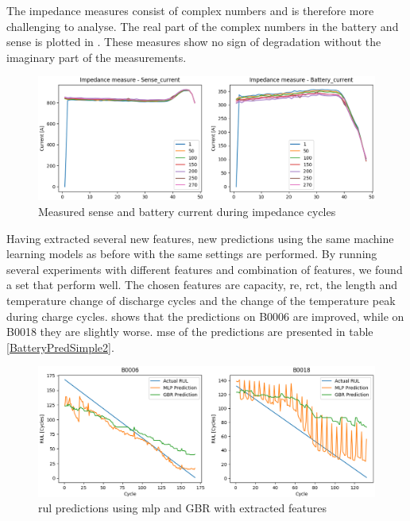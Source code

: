 \documentclass[english, a4paper]{report}
\begin{document}
{{{{                The impedance measures consist of complex numbers and is therefore more challenging to analyse. The real part of the complex numbers in the battery and sense is plotted in . These measures show no sign of degradation without the imaginary part of the measurements.  
                
                \begin{figure}[H]
                    \centering \includegraphics[width=1\textwidth]{ImpedanceDegradadtion}
                    \caption{Measured sense and battery current during impedance cycles}
                    \label{fig:ImpedanceDegradadtion}
                \end{figure}
                
                Having extracted several new features, new predictions using the same machine learning models as before with the same settings are performed. By running several experiments with different features and combination of features, we found a set that perform well. The chosen features are capacity, re, rct, the length and temperature change of discharge cycles and the change of the temperature peak during charge cycles.  shows that the predictions on B0006 are improved, while on B0018 they are slightly worse. \gls{mse} of the predictions are presented in table \ref{BatteryPredSimple2}.
                
                \begin{figure}[H]
                    \centering \includegraphics[width=1\textwidth]{Prediction-AddedFeatures2}
                    \caption{\gls{rul} predictions using \gls{mlp} and GBR with extracted features}
                    \label{fig:Prediction-AddedFeatures2}
                \end{figure}
                
}}}}
\end{document}
